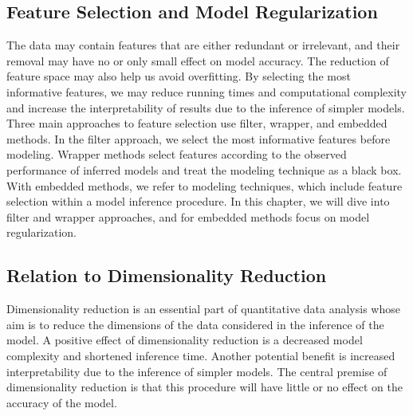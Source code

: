 \begin{refsection}
\chapter{Feature Selection and Model Regularization}

\begin{summary}
The data may contain features that are either redundant or irrelevant, and their removal may have no or only small effect on model accuracy. The reduction of feature space may also help us avoid overfitting. By selecting the most informative features, we may reduce running times and computational complexity and increase the interpretability of results due to the inference of simpler models. Three main approaches to feature selection use filter, wrapper, and embedded methods. In the filter approach, we select the most informative features before modeling. Wrapper methods select features according to the observed performance of inferred models and treat the modeling technique as a black box. With embedded methods, we refer to modeling techniques, which include feature selection within a model inference procedure. In this chapter, we will dive into filter and wrapper approaches, and for embedded methods focus on model regularization.
\end{summary}

\section{Relation to Dimensionality Reduction}

Dimensionality reduction is an essential part of quantitative data analysis whose aim is to reduce the dimensions of the data considered in the inference of the model. A positive effect of dimensionality reduction is a decreased model complexity and shortened inference time. Another potential benefit is increased interpretability due to the inference of simpler models. The central premise of dimensionality reduction is that this procedure will have little or no effect on the accuracy of the model. 


\end{refsection}
